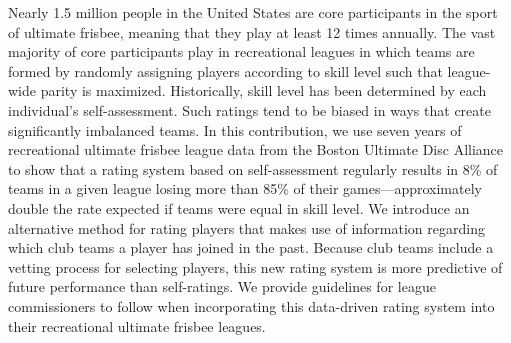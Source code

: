 Nearly 1.5 million people in the United States are core participants in the sport of ultimate frisbee, meaning that they play at least 12 times annually. The vast majority of core participants play in recreational leagues in which teams are formed by randomly assigning players according to skill level such that league-wide parity is maximized. Historically, skill level has been determined by each individual’s self-assessment. Such ratings tend to be biased in ways that create significantly imbalanced teams. In this contribution, we use seven years of recreational ultimate frisbee league data from the Boston Ultimate Disc Alliance to show that a rating system based on self-assessment regularly results in 8\% of teams in a given league losing more than 85\% of their games---approximately double the rate expected if teams were equal in skill level.  We introduce an alternative method for rating players that makes use of information regarding which club teams a player has joined in the past. Because club teams include a vetting process for selecting players, this new rating system is more predictive of future performance than self-ratings. We provide guidelines for league commissioners to follow when incorporating this data-driven rating system into their recreational ultimate frisbee leagues.